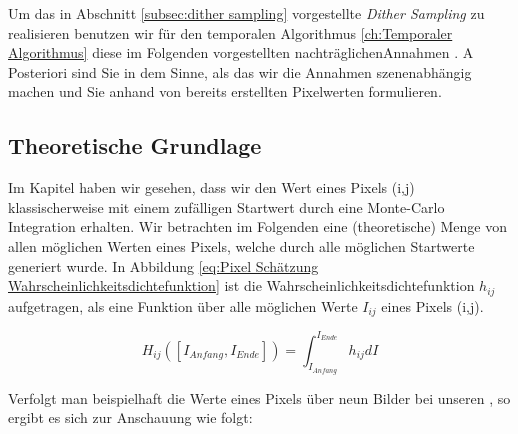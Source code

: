 Um das in Abschnitt \ref{subsec:dither sampling} vorgestellte \textit{Dither Sampling} zu realisieren
benutzen wir für den temporalen Algorithmus \ref{ch:Temporaler Algorithmus} diese im Folgenden vorgestellten
\glqq nachträglichen\grqq Annahmen \cite{hal02158423}. 
A Posteriori sind Sie in dem Sinne, als das wir die Annahmen szenenabhängig machen und Sie anhand 
von bereits erstellten Pixelwerten formulieren. 

\subsection{Theoretische Grundlage}

Im Kapitel  haben wir gesehen, dass 
wir den Wert eines Pixels (i,j) klassischerweise mit einem zufälligen
Startwert durch eine Monte-Carlo Integration erhalten. Wir betrachten im
Folgenden eine (theoretische) Menge von allen möglichen Werten eines 
Pixels, welche durch alle möglichen Startwerte generiert wurde.
In Abbildung \ref{eq:Pixel Schätzung Wahrscheinlichkeitsdichtefunktion} ist die Wahrscheinlichkeitsdichtefunktion
$h_{ij}$ aufgetragen, als eine Funktion über alle möglichen Werte 
$I_{ij}$ eines Pixels (i,j).

\begin{equation}\label{eq:Pixel Schätzung Wahrscheinlichkeitsdichtefunktion}
    H_{ij}([I_{Anfang},I_{Ende}]) = \int_{I_{Anfang}}^{I_{Ende}} h_{ij} dI
\end{equation}

Verfolgt man beispielhaft die Werte eines Pixels über neun Bilder bei unseren , 
so ergibt es sich zur Anschauung wie folgt:

